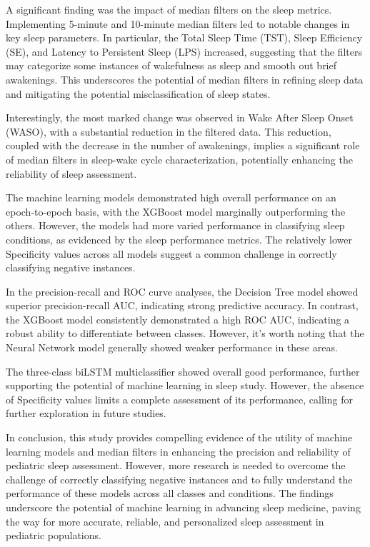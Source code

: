 \documentclass[
  super,
  preprint,
  3p]{elsarticle}
\begin{document}
A significant finding was the impact of median filters on the sleep
metrics. Implementing 5-minute and 10-minute median filters led to
notable changes in key sleep parameters. In particular, the Total Sleep
Time (TST), Sleep Efficiency (SE), and Latency to Persistent Sleep (LPS)
increased, suggesting that the filters may categorize some instances of
wakefulness as sleep and smooth out brief awakenings. This underscores
the potential of median filters in refining sleep data and mitigating
the potential misclassification of sleep states.

Interestingly, the most marked change was observed in Wake After Sleep
Onset (WASO), with a substantial reduction in the filtered data. This
reduction, coupled with the decrease in the number of awakenings,
implies a significant role of median filters in sleep-wake cycle
characterization, potentially enhancing the reliability of sleep
assessment.

The machine learning models demonstrated high overall performance on an
epoch-to-epoch basis, with the XGBoost model marginally outperforming
the others. However, the models had more varied performance in
classifying sleep conditions, as evidenced by the sleep performance
metrics. The relatively lower Specificity values across all models
suggest a common challenge in correctly classifying negative instances.

In the precision-recall and ROC curve analyses, the Decision Tree model
showed superior precision-recall AUC, indicating strong predictive
accuracy. In contrast, the XGBoost model consistently demonstrated a
high ROC AUC, indicating a robust ability to differentiate between
classes. However, it's worth noting that the Neural Network model
generally showed weaker performance in these areas.

The three-class biLSTM multiclassifier showed overall good performance,
further supporting the potential of machine learning in sleep study.
However, the absence of Specificity values limits a complete assessment
of its performance, calling for further exploration in future studies.

In conclusion, this study provides compelling evidence of the utility of
machine learning models and median filters in enhancing the precision
and reliability of pediatric sleep assessment. However, more research is
needed to overcome the challenge of correctly classifying negative
instances and to fully understand the performance of these models across
all classes and conditions. The findings underscore the potential of
machine learning in advancing sleep medicine, paving the way for more
accurate, reliable, and personalized sleep assessment in pediatric
populations.

\newpage


\renewcommand\refname{References}
  
\end{document}
